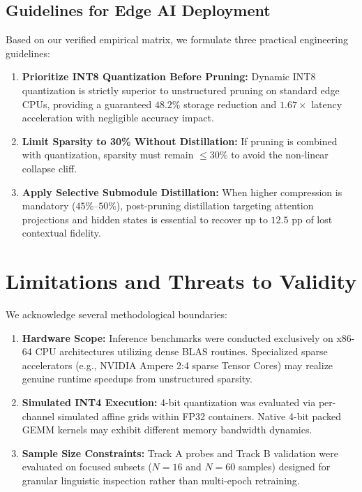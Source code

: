 \documentclass[conference]{IEEEtran}
\begin{document}
\subsection{Guidelines for Edge AI Deployment}
Based on our verified empirical matrix, we formulate three practical engineering guidelines:
\begin{enumerate}
    \item \textbf{Prioritize INT8 Quantization Before Pruning:} Dynamic INT8 quantization is strictly superior to unstructured pruning on standard edge CPUs, providing a guaranteed $48.2\%$ storage reduction and $1.67\times$ latency acceleration with negligible accuracy impact.
    \item \textbf{Limit Sparsity to 30\% Without Distillation:} If pruning is combined with quantization, sparsity must remain $\le 30\%$ to avoid the non-linear collapse cliff.
    \item \textbf{Apply Selective Submodule Distillation:} When higher compression is mandatory ($45\%\text{--}50\%$), post-pruning distillation targeting attention projections and hidden states is essential to recover up to $12.5\text{ pp}$ of lost contextual fidelity.
\end{enumerate}

\section{Limitations and Threats to Validity}
We acknowledge several methodological boundaries:
\begin{enumerate}
    \item \textbf{Hardware Scope:} Inference benchmarks were conducted exclusively on x86-64 CPU architectures utilizing dense BLAS routines. Specialized sparse accelerators (e.g., NVIDIA Ampere 2:4 sparse Tensor Cores) may realize genuine runtime speedups from unstructured sparsity.
    \item \textbf{Simulated INT4 Execution:} 4-bit quantization was evaluated via per-channel simulated affine grids within FP32 containers. Native 4-bit packed GEMM kernels may exhibit different memory bandwidth dynamics.
    \item \textbf{Sample Size Constraints:} Track A probes and Track B validation were evaluated on focused subsets ($N=16$ and $N=60$ samples) designed for granular linguistic inspection rather than multi-epoch retraining.
\end{enumerate}
\end{document}
